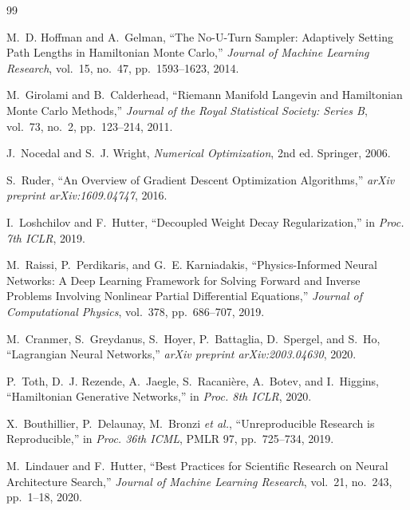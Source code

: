 \documentclass[12pt,a4paper]{article}
\begin{document}
\begin{thebibliography}{99}

M.~D. Hoffman and A.~Gelman,
``The No-U-Turn Sampler: Adaptively Setting Path Lengths in Hamiltonian
Monte Carlo,''
\textit{Journal of Machine Learning Research}, vol.~15, no.~47,
pp.~1593--1623, 2014.

M.~Girolami and B.~Calderhead,
``Riemann Manifold Langevin and Hamiltonian Monte Carlo Methods,''
\textit{Journal of the Royal Statistical Society: Series B},
vol.~73, no.~2, pp.~123--214, 2011.


J.~Nocedal and S.~J. Wright,
\textit{Numerical Optimization}, 2nd ed.
Springer, 2006.

S.~Ruder,
``An Overview of Gradient Descent Optimization Algorithms,''
\textit{arXiv preprint arXiv:1609.04747}, 2016.

I.~Loshchilov and F.~Hutter,
``Decoupled Weight Decay Regularization,''
in \textit{Proc. 7th ICLR}, 2019.


M.~Raissi, P.~Perdikaris, and G.~E. Karniadakis,
``Physics-Informed Neural Networks: A Deep Learning Framework for Solving
Forward and Inverse Problems Involving Nonlinear Partial Differential
Equations,'' \textit{Journal of Computational Physics}, vol.~378,
pp.~686--707, 2019.

M.~Cranmer, S.~Greydanus, S.~Hoyer, P.~Battaglia, D.~Spergel, and S.~Ho,
``Lagrangian Neural Networks,''
\textit{arXiv preprint arXiv:2003.04630}, 2020.

P.~Toth, D.~J. Rezende, A.~Jaegle, S.~Racani\`{e}re, A.~Botev,
and I.~Higgins,
``Hamiltonian Generative Networks,''
in \textit{Proc. 8th ICLR}, 2020.


X.~Bouthillier, P.~Delaunay, M.~Bronzi \textit{et al.},
``Unreproducible Research is Reproducible,''
in \textit{Proc. 36th ICML}, PMLR 97, pp.~725--734, 2019.

M.~Lindauer and F.~Hutter,
``Best Practices for Scientific Research on Neural Architecture Search,''
\textit{Journal of Machine Learning Research}, vol.~21, no.~243,
pp.~1--18, 2020.


\end{thebibliography}
\end{document}
